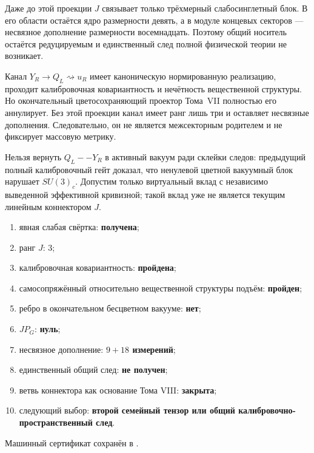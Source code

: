 Даже до этой проекции $J$ связывает только трёхмерный слабосинглетный блок.
В его области остаётся ядро размерности девять, а в модуле концевых секторов ---
несвязное дополнение размерности восемнадцать. Поэтому общий носитель
остаётся редуцируемым и единственный след полной физической теории не
возникает.

\begin{theorem}
Канал $Y_R\to Q_L\rightsquigarrow u_R$ имеет каноническую нормированную
реализацию, проходит калибровочная ковариантность и нечётность вещественной структуры. Но окончательный
цветосохраняющий проектор Тома~VII полностью его аннулирует. Без этой
проекции канал имеет ранг лишь три и оставляет несвязные дополнения.
Следовательно, он не является межсекторным родителем и не фиксирует
массовую метрику.
\end{theorem}

\begin{nogocriterion}
Нельзя вернуть $Q_L--Y_R$ в активный вакуум ради склейки следов: предыдущий
полный калибровочный гейт доказал, что ненулевой цветной вакуумный блок нарушает
$SU(3)_c$. Допустим только виртуальный вклад с независимо выведенной
эффективной кривизной; такой вклад уже не является текущим линейным
коннектором $J$.
\end{nogocriterion}

\begin{protocol}
\begin{enumerate}
 \item явная слабая свёртка: \textbf{получена};
 \item ранг $J$: \textbf{$3$};
 \item калибровочная ковариантность: \textbf{пройдена};
 \item самосопряжённый относительно вещественной структуры подъём: \textbf{пройден};
 \item ребро в окончательном бесцветном вакууме: \textbf{нет};
 \item $JP_G$: \textbf{нуль};
 \item несвязное дополнение: \textbf{$9+18$ измерений};
 \item единственный общий след: \textbf{не получен};
 \item ветвь коннектора как основание Тома VIII: \textbf{закрыта};
 \item следующий выбор: \textbf{второй семейный тензор или общий
 калибровочно-пространственный след}.
\end{enumerate}
\end{protocol}

Машинный сертификат сохранён в
.